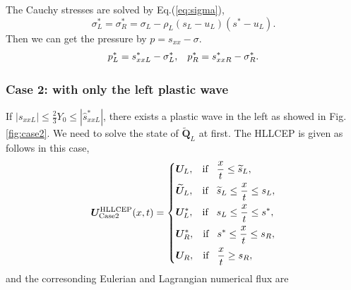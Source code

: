 \documentclass{article}
\numberwithin{equation}{section}
\numberwithin{table}{section}
\begin{document}
 The Cauchy stresses are solved  by Eq.(\ref{eq:sigma}),
\begin{equation*}
  \sigma_L^*=\sigma_R^*=\sigma_L -\rho_L (s_L-u_L)(s^*-u_L).
\end{equation*}
 Then we can get the pressure by $p =s_{xx}-\sigma$.
\begin{equation}
  p_L^* = s_{xxL}^* - \sigma_L^*, \hspace{0.3cm}   p_R^* = s_{xxR}^* - \sigma_R^*.
\end{equation}

 \subsubsection{Case 2:  with only the left plastic wave}\label{sec:case2}
 If $|s_{xxL}| \le \frac{2}{3}Y_0 \le  |\hat{s}_{xxL}^*|$, there exists a plastic wave in the left as showed in Fig.\ref{fig:case2}. We need to solve the state  of $\widetilde{\bm{Q}}_L$ at first. The HLLCEP is given as follows in this case,
 \begin{equation}\label{eq:HLLCEP2}
   \bm{U}^{\text{HLLCEP}}_{\text{Case2}}(x,t) = \left\{ \begin{aligned}
	   & \bm{U}_L, \hspace{0.3cm} \text{if} \hspace{0.3cm} \frac{x}{t}\le \widetilde{s}_L, \\
		&  \widetilde{\bm{U}}_L, \hspace{0.3cm} \text{if} \hspace{0.3cm} \widetilde{s}_L\le \frac{x}{t} \le  s_L, \\
		&\bm{U}_L^*, \hspace{0.3cm} \text{if} \hspace{0.3cm} s_L\le \frac{x}{t} \le s^*, \\
		& \bm{U}_R^*, \hspace{0.3cm} \text{if} \hspace{0.3cm} s^*\le \frac{x}{t} \le s_R,\\
		& \bm{U}_R, \hspace{0.3cm} \text{if} \hspace{0.3cm} \frac{x}{t}\ge s_R, \\
	  \end{aligned}
	\right.
  \end{equation}
  and the corresonding Eulerian and Lagrangian numerical flux are
\end{document}
